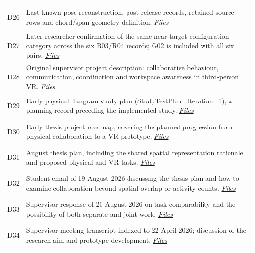 \begin{longtable}{@{}p{14mm}>{\raggedright\arraybackslash}p{140mm}@{}}
\hypertarget{src:D26}{}\label{src:D26}D26 & Last-known-pose reconstruction, post-release records, retained source rows and chord/span geometry definition. \href{https://github.com/YiyangQin-UQ/REIT7841/blob/main/thesis/v1.1/materials/README.md\#d26}{\textit{Files}} \\
\hypertarget{src:D27}{}\label{src:D27}D27 & Later researcher confirmation of the same near-target configuration category across the six R03/R04 records; G02 is included with all six pairs. \href{https://github.com/YiyangQin-UQ/REIT7841/blob/main/thesis/v1.1/materials/README.md\#d27}{\textit{Files}} \\
\hypertarget{src:D28}{}\label{src:D28}D28 & Original supervisor project description: collaborative behaviour, communication, coordination and workspace awareness in third-person VR. \href{https://github.com/YiyangQin-UQ/REIT7841/blob/main/thesis/v1.1/materials/README.md\#d28}{\textit{Files}} \\
\hypertarget{src:D29}{}\label{src:D29}D29 & Early physical Tangram study plan (StudyTestPlan\_Iteration\_1); a planning record preceding the implemented study. \href{https://github.com/YiyangQin-UQ/REIT7841/blob/main/thesis/v1.1/materials/README.md\#d29}{\textit{Files}} \\
\hypertarget{src:D30}{}\label{src:D30}D30 & Early thesis project roadmap, covering the planned progression from physical collaboration to a VR prototype. \href{https://github.com/YiyangQin-UQ/REIT7841/blob/main/thesis/v1.1/materials/README.md\#d30}{\textit{Files}} \\
\hypertarget{src:D31}{}\label{src:D31}D31 & August thesis plan, including the shared spatial representation rationale and proposed physical and VR tasks. \href{https://github.com/YiyangQin-UQ/REIT7841/blob/main/thesis/v1.1/materials/README.md\#d31}{\textit{Files}} \\
\hypertarget{src:D32}{}\label{src:D32}D32 & Student email of 19 August 2026 discussing the thesis plan and how to examine collaboration beyond spatial overlap or activity counts. \href{https://github.com/YiyangQin-UQ/REIT7841/blob/main/thesis/v1.1/materials/README.md\#d32}{\textit{Files}} \\
\hypertarget{src:D33}{}\label{src:D33}D33 & Supervisor response of 20 August 2026 on task comparability and the possibility of both separate and joint work. \href{https://github.com/YiyangQin-UQ/REIT7841/blob/main/thesis/v1.1/materials/README.md\#d33}{\textit{Files}} \\
\hypertarget{src:D34}{}\label{src:D34}D34 & Supervisor meeting transcript indexed to 22 April 2026; discussion of the research aim and prototype development. \href{https://github.com/YiyangQin-UQ/REIT7841/blob/main/thesis/v1.1/materials/README.md\#d34}{\textit{Files}} \\

\end{longtable}
